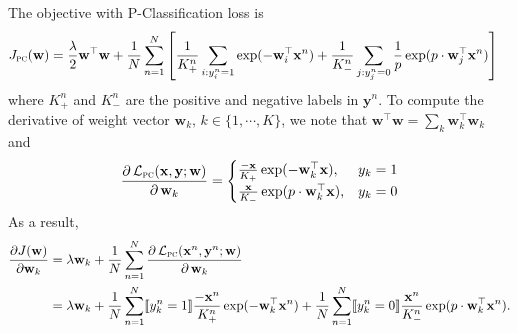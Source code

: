 \documentclass[9pt]{extarticle}
\newcommand{\llb}{\llbracket}
\newcommand{\rrb}{\rrbracket}
\newcommand{\x}{\mathbf{x}}
\newcommand{\y}{\mathbf{y}}
\newcommand{\1}{\mathbf{1}}
\newcommand{\w}{\mathbf{w}}
\newcommand{\LCal}{\mathcal{L}}
\begin{document}
The objective with P-Classification loss is
\begin{equation}
\label{eq:obj_pc}
\begin{aligned}
J_\textsc{pc}(\w) 
&= \frac{\lambda}{2} \w^\top \w + \frac{1}{N} \sum_{n=1}^N \left[
   \frac{1}{K_+^n} \sum_{i:y_i^n=1} \exp(-\w_i^\top \x^n) + 
   \frac{1}{K_-^n} \sum_{j:y_j^n=0} \frac{1}{p} \exp(p \cdot \w_j^\top \x^n) \right]
\end{aligned}
\end{equation}
where $K_+^n$ and $K_-^n$ are the positive and negative labels in $\y^n$.
To compute the derivative of weight vector $\w_k, \, k \in \{1,\cdots,K\}$,
we note that $\w^\top \w = \sum_k \w_k^\top \w_k$ and
$$
\frac{\partial \, \LCal_\textsc{pc}(\x, \y; \w)}{\partial \, \w_k}
= \begin{cases}
    \frac{-\x}{K_+} \exp(-\w_k^\top \x), & y_k = 1 \\
    \frac{\x }{K_-} \exp(p \cdot \w_k^\top \x), & y_k = 0
  \end{cases}
$$
As a result,
\begin{equation}
\label{eq:grad_pc}
\begin{aligned}
\frac{\partial J(\w)} {\partial \w_k} 
&= \lambda \w_k + \frac{1}{N} \sum_{n=1}^N \frac{\partial \, \LCal_\textsc{pc}(\x^n, \y^n; \w)}{\partial \, \w_k} \\
&= \lambda \w_k + 
   \frac{1}{N} \sum_{n=1}^N \llb y_k^n = 1 \rrb \frac{-\x^n}{K_+^n} \exp(-\w_k^\top \x^n) + 
   \frac{1}{N} \sum_{n=1}^N \llb y_k^n = 0 \rrb \frac{\x^n }{K_-^n} \exp(p \cdot \w_k^\top \x^n).
\end{aligned}
\end{equation}
\end{document}
